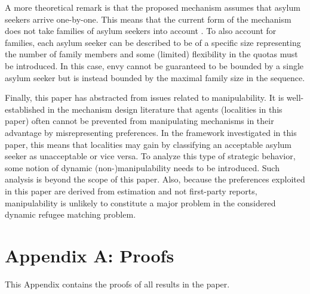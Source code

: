 \documentclass[12pt,fleqn]{article}
\begin{document}
A more theoretical remark is that the proposed mechanism assumes that asylum seekers arrive one-by-one. This means that the current form of the mechanism does not take families of asylum seekers into account \citep[see, e.g.,][for a mechanism that keeps families intact in house allocation problems with asylum seekers]{bib:AnderssonEhlers}. To also account for families, each asylum seeker can be described to be of a specific size representing the number of family members and some (limited) flexibility in the quotas must be introduced. In this case, envy cannot be guaranteed to be bounded by a single asylum seeker but is instead bounded by the maximal family size in the sequence.

Finally, this paper has abstracted from issues related to manipulability. It is  well-established in the mechanism design literature that agents (localities in this paper) often cannot be prevented from manipulating mechanisms in their advantage by misrepresenting preferences. In the framework investigated in this paper, this means that localities may gain by classifying an acceptable asylum seeker as unacceptable or vice versa. To analyze this type of strategic behavior, some notion of dynamic (non-)manipulability needs to be introduced. Such analysis is beyond the scope of this paper. Also, because the preferences exploited in this paper are derived from estimation and not first-party reports, manipulability is unlikely to constitute a major problem in the considered dynamic refugee matching problem.




\newpage

\section*{Appendix A: Proofs}
This Appendix contains the proofs of all results in the paper.

\medskip
\end{document}
